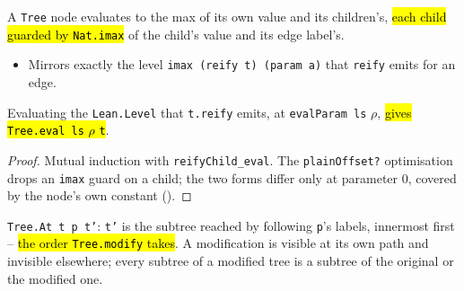 \begin{definition}
\label{def:lvl-tree-eval}
\leanok
{}
 A \texttt{Tree} node evaluates to the max of its own value and its children's, \hl{each
child guarded by \texttt{Nat.imax}} of the child's value and its edge label's.
\begin{itemize}
\item Mirrors exactly the level \texttt{imax (reify t) (param a)} that \texttt{reify} emits for an
edge.
\end{itemize}
\end{definition}

\begin{theorem}
\label{thm:lvl-tree-reify-eval}
\leanok
{}
 Evaluating the \texttt{Lean.Level} that \texttt{t.reify} emits, at \texttt{evalParam
ls} $\rho$, \hl{gives \texttt{Tree.eval ls} $\rho$ \texttt{t}}.
\end{theorem}
\begin{proof}
\leanok
{} Mutual induction with \texttt{reifyChild\_eval}. The \texttt{plainOffset?} optimisation
drops an \texttt{imax} guard on a child; the two forms differ only at parameter $0$, covered by the
node's own constant ().
\end{proof}

\begin{definition}
\label{def:lvl-tree-at}
\leanok
{}

 \texttt{Tree.At t p t'}: \texttt{t'} is the subtree reached by following \texttt{p}'s
labels, innermost first -- \hl{the order \texttt{Tree.modify} takes}. A modification is visible at its
own path and invisible elsewhere; every subtree of a modified tree is a subtree of the original or the
modified one.
\end{definition}

